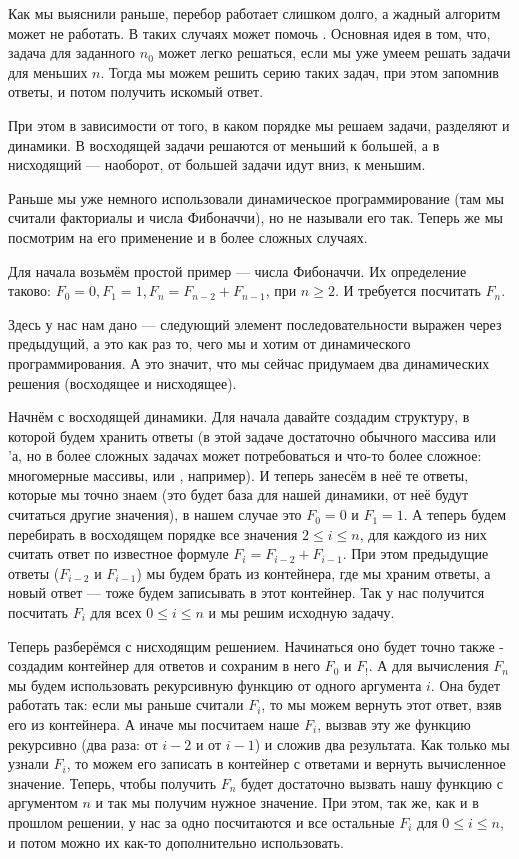 Как мы выяснили раньше, перебор работает слишком долго, а жадный алгоритм может не работать. В таких случаях может помочь . Основная идея в том, что, задача для заданного $n_0$ может легко решаться, если мы уже умеем решать задачи для меньших $n$. Тогда мы можем решить серию таких задач, при этом запомнив ответы, и потом получить искомый ответ.

При этом в зависимости от того, в каком порядке мы решаем задачи, разделяют  и  динамики. В восходящей задачи решаются от меньший к большей, а в нисходящий — наоборот, от большей задачи идут вниз, к меньшим.

Раньше мы уже немного использовали динамическое программирование (там мы считали факториалы и числа Фибоначчи), но не называли его так. Теперь же мы посмотрим на его применение и в более сложных случаях.


Для начала возьмём простой пример — числа Фибоначчи. Их определение таково: $F_0 = 0, F_1 = 1, F_n = F_{n - 2} + F_{n - 1}$, при $n \ge 2$. И требуется посчитать $F_n$.

Здесь у нас нам дано  — следующий элемент последовательности выражен через предыдущий, а это как раз то, чего мы и хотим от динамического программирования. А это значит, что мы сейчас придумаем два динамических решения (восходящее и нисходящее).

Начнём с восходящей динамики. Для начала давайте создадим структуру, в которой будем хранить ответы (в этой задаче достаточно обычного массива или 'а, но в более сложных задачах может потребоваться и что-то более сложное: многомерные массивы, или , например). И теперь занесём в неё те ответы, которые мы точно знаем (это будет база для нашей динамики, от неё будут считаться другие значения), в нашем случае это $F_0 = 0$ и $F_1 = 1$. А теперь будем перебирать в восходящем порядке все значения $2 \leq i \leq n$, для каждого из них считать ответ по известное формуле $F_i = F_{i - 2} + F_{i - 1}$. При этом предыдущие ответы ($F_{i - 2}$ и $F_{i - 1}$) мы будем брать из контейнера, где мы храним ответы, а новый ответ — тоже будем записывать в этот контейнер. Так у нас получится посчитать $F_i$ для всех $0 \leq i \leq n$ и мы решим исходную задачу.

Теперь разберёмся с нисходящим решением. Начинаться оно будет точно также - создадим контейнер для ответов и сохраним в него $F_0$ и $F_!$. А для вычисления $F_n$ мы будем использовать рекурсивную функцию от одного аргумента $i$. Она будет работать так: если мы раньше считали $F_i$, то мы можем вернуть этот ответ, взяв его из контейнера. А иначе мы посчитаем наше $F_i$, вызвав эту же функцию рекурсивно (два раза: от $i - 2$ и от $i - 1$) и сложив два результата. Как только мы узнали $F_i$, то можем его записать в контейнер с ответами и вернуть вычисленное значение. Теперь, чтобы получить $F_n$ будет достаточно вызвать нашу функцию с аргументом $n$ и так мы получим нужное значение. При этом, так же, как и в прошлом решении, у нас за одно посчитаются и все остальные $F_i$ для $0 \leq i \leq n$, и потом можно их как-то дополнительно использовать.

